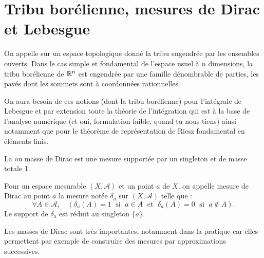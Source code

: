 \medskip
\section{Tribu borélienne, mesures de Dirac et Lebesgue}

\begin{definition}
On appelle  sur un espace topologique donné la tribu engendrée par les
ensembles ouverts.
Dans le cas simple et fondamental de l'espace usuel à $n$ dimensions, la tribu borélienne de $\mathbb R^n$
est engendrée par une famille dénombrable de parties, les pavés dont les sommets sont à
coordonnées rationnelles.
\end{definition}

On aura besoin de ces notions (dont la tribu borélienne) pour l'intégrale de Lebesgue et par extension
toute la théorie de l'intégration qui est à la base de l'analyse numérique (et oui, formulation faible, quand
tu nous tiens) ainsi notamment que pour le théorème  de représentation de Riesz fondamental en
éléments finis.


La 
ou masse de Dirac est une mesure supportée par un singleton
et de masse totale 1.

\begin{definition}
Pour un espace mesurable $(X,\mathcal{A})$ et un point $a$ de $X$, on appelle mesure de Dirac au
point $a$ la mesure notée $\delta_a$ sur $(X, \mathcal{A})$ telle que :
\begin{equation}
    \forall A \in \mathcal{A},\quad ( \delta_a(A)=1 \; \text{ si } \; a \in A \; \text{ et } \; \delta_a(A)=0 \; \text{ si } \; a \notin A ).
\end{equation}
Le support de $\delta_a$ est réduit au singleton $\{a\}$.
\end{definition}

Les masses de Dirac sont très importantes, notamment dans la pratique car elles permettent par exemple
de construire des mesures par approximations successives.


